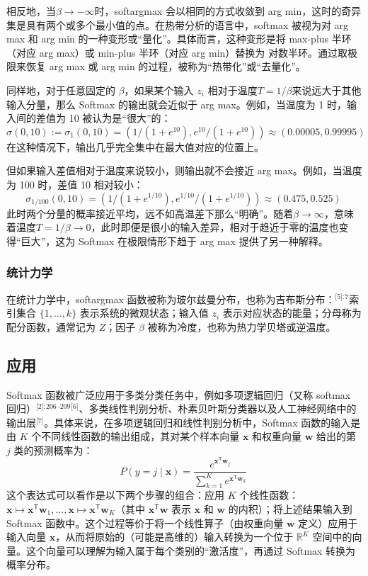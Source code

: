 相反地，当$\beta \to -\infty$时，softargmax 会以相同的方式收敛到 arg min，这时的奇异集是具有两个或多个最小值的点。在热带分析的语言中，softmax 被视为对 arg max 和 arg min 的一种变形或“量化”。具体而言，这种变形是将 max-plus 半环（对应 arg max）或 min-plus 半环（对应 arg min）替换为 对数半环。通过取极限来恢复 arg max 或 arg min 的过程，被称为“热带化”或“去量化”。

同样地，对于任意固定的 $\beta$，如果某个输入 $z_i$ 相对于温度$T = 1/\beta$来说远大于其他输入分量，那么 Softmax 的输出就会近似于 arg max。例如，当温度为 1 时，输入间的差值为 10 被认为是“很大”的：
$$
\sigma(0, 10) := \sigma_1(0, 10) = \left( 1/(1 + e^{10}), e^{10}/(1 + e^{10})\right) \approx (0.00005, 0.99995)~
$$
在这种情况下，输出几乎完全集中在最大值对应的位置上。

但如果输入差值相对于温度来说较小，则输出就不会接近 arg max。例如，当温度为 100 时，差值 10 相对较小：
$$
\sigma_{1/100}(0, 10) = \left( 1/(1 + e^{1/10}), e^{1/10}/(1 + e^{1/10})\right) \approx (0.475, 0.525)~
$$
此时两个分量的概率接近平均，远不如高温差下那么“明确”。随着$\beta \to \infty$，意味着温度$T = 1/\beta \to 0$，此时即便是很小的输入差异，相对于趋近于零的温度也变得“巨大”，这为 Softmax 在极限情形下趋于 arg max 提供了另一种解释。
\subsubsection{统计力学}
在统计力学中，softargmax 函数被称为玻尔兹曼分布，也称为吉布斯分布：\(^\text{[5]: 7}\)索引集合 $\{1, \dots, k\}$ 表示系统的微观状态；输入值 $z_i$ 表示对应状态的能量；分母称为配分函数，通常记为 $Z$；因子 $\beta$ 被称为冷度，也称为热力学贝塔或逆温度。
\subsection{应用}
Softmax 函数被广泛应用于多类分类任务中，例如多项逻辑回归（又称 softmax 回归）\(^\text{[2]: 206–209 [6]}\)、多类线性判别分析、朴素贝叶斯分类器以及人工神经网络中的输出层\(^\text{[7]}\)。具体来说，在多项逻辑回归和线性判别分析中，Softmax 函数的输入是由 $K$ 个不同线性函数的输出组成，其对某个样本向量 $\mathbf{x}$ 和权重向量 $\mathbf{w}$ 给出的第 $j$ 类的预测概率为：
$$
P(y = j \mid \mathbf{x}) = \frac{e^{\mathbf{x}^\mathsf{T} \mathbf{w}_j}}{\sum_{k=1}^{K} e^{\mathbf{x}^\mathsf{T} \mathbf{w}_k}}~
$$
这个表达式可以看作是以下两个步骤的组合：应用 $K$ 个线性函数：$\mathbf{x} \mapsto \mathbf{x}^\mathsf{T} \mathbf{w}_1, \dotsc, \mathbf{x} \mapsto \mathbf{x}^\mathsf{T} \mathbf{w}_K$（其中 $\mathbf{x}^\mathsf{T} \mathbf{w}$ 表示 $\mathbf{x}$ 和 $\mathbf{w}$ 的内积）；将上述结果输入到 Softmax 函数中。这个过程等价于将一个线性算子（由权重向量 $\mathbf{w}$ 定义）应用于输入向量 $\mathbf{x}$，从而将原始的（可能是高维的）输入转换为一个位于 $\mathbb{R}^K$ 空间中的向量。这个向量可以理解为输入属于每个类别的“激活度”，再通过 Softmax 转换为概率分布。
